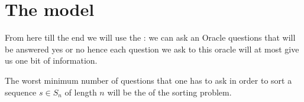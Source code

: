 \section{The model}
\label{tree:sorting:model}

From here till the end we will use the  : we can ask an Oracle questions that will be answered yes or no hence each question we ask to this oracle will at most give us one bit of information.

The worst minimum number of questions that one has to ask in order to sort a sequence $s \in S_n$ of length $n$ will be the  of the sorting problem.